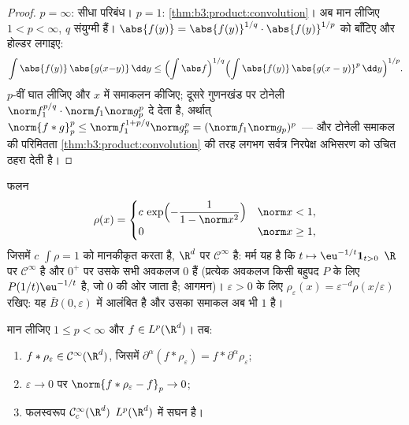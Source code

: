 \begin{proof}
$p = \infty$: सीधा परिबंध। $p = 1$: \cref{thm:b3:product:convolution}। अब मान लीजिए $1 < p < \infty$, $q$
संयुग्मी हैं। $\abs{f(y)} = \abs{f(y)}^{1/q}\cdot
\abs{f(y)}^{1/p}$ को बाँटिए और होल्डर लगाइए:
\[
\int\abs{f(y)}\,\abs{g(x{-}y)}\,\dd y
\leq \Bigl(\int\abs f\Bigr)^{1/q}
\Bigl(\int\abs{f(y)}\,\abs{g(x - y)}^p\,\dd y\Bigr)^{1/p} .
\]
$p$-वीं घात लीजिए और $x$ में समाकलन कीजिए; दूसरे गुणनखंड पर
टोनेली $\norm f_1^{p/q}\cdot\norm f_1\norm g_p^p$ दे देता है, अर्थात् $\norm{f*g}_p^p \leq \norm f_1^{1 + p/q}\norm g_p^p =
(\norm f_1\norm g_p)^p$ --- और टोनेली समाकल की
परिमितता \cref{thm:b3:product:convolution} की तरह लगभग सर्वत्र निरपेक्ष अभिसरण को उचित ठहरा
देती है।
\end{proof}

\begin{definition}[मृदुकारक]\label{def:b3:lp:mollifier}
फलन
\[
\rho(x) = \begin{cases}
c\,\exp\Bigl(-\dfrac{1}{1 - \norm x^2}\Bigr) & \norm x < 1,\\
0 & \norm x \geq 1,
\end{cases}
\]
जिसमें $c$ $\int\rho = 1$ को मानकीकृत करता है, $\R^d$ पर $\mathcal C^\infty$ है: मर्म
यह है कि $t \mapsto \eu^{-1/t}\mathbf
1_{t>0}$ $\R$ पर $\mathcal C^\infty$ है और $0^+$ पर उसके सभी अवकलज $0$
हैं (प्रत्येक अवकलज किसी बहुपद $P$ के लिए $P(1/t)\eu^{-1/t}$ है, जो $0$ की
ओर जाता है; आगमन)। $\varepsilon > 0$ के लिए $\rho_\varepsilon(x) =
\varepsilon^{-d}\rho(x/\varepsilon)$ रखिए: यह $\bar B(0,
\varepsilon)$ में आलंबित है
और उसका समाकल अब भी $1$ है।
\end{definition}

\begin{theorem}[नियमितीकरण]\label{thm:b3:lp:regularization}
मान लीजिए $1 \leq p < \infty$ और $f \in L^p(\R^d)$। तब:
\begin{enumerate}
  \item $f * \rho_\varepsilon \in \mathcal C^\infty(\R^d)$, जिसमें $\partial^\alpha(f * \rho_\varepsilon) = f *
        \partial^\alpha\rho_\varepsilon$;
  \item $\varepsilon \to 0$ पर $\norm{f * \rho_\varepsilon - f}_p \to 0$;
  \item फलस्वरूप $\mathcal C^\infty_c(\R^d)$ $L^p(\R^d)$ में सघन है।
\end{enumerate}
\end{theorem}

